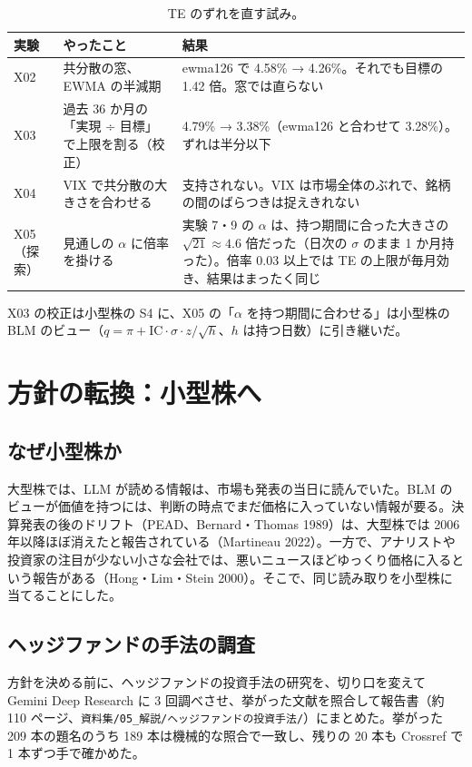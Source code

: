 \documentclass[xelatex,ja=standard,jafont=haranoaji,a4paper,10pt]{bxjsreport}
\newcommand{\code}[1]{\texttt{#1}}
\begin{document}
\begin{longtable}{p{2.0cm}p{5.4cm}p{6.4cm}}
\caption{TE のずれを直す試み。}\label{tab:te}\\
\toprule
\textbf{実験} & \textbf{やったこと} & \textbf{結果} \\
\midrule
\endfirsthead
\bottomrule
\endfoot
X02 & 共分散の窓、EWMA の半減期 & ewma126 で 4.58\% → 4.26\%。それでも目標の 1.42 倍。窓では直らない \\
X03 & 過去 36 か月の「実現 ÷ 目標」で上限を割る（校正） & 4.79\% → 3.38\%（ewma126 と合わせて 3.28\%）。ずれは半分以下 \\
X04 & VIX で共分散の大きさを合わせる & 支持されない。VIX は市場全体のぶれで、銘柄の間のばらつきは捉えきれない \\
X05（探索） & 見通しの $\alpha$ に倍率を掛ける & 実験 7・9 の $\alpha$ は、持つ期間に合った大きさの $\sqrt{21}\approx 4.6$ 倍だった（日次の $\sigma$ のまま 1 か月持った）。倍率 0.03 以上では TE の上限が毎月効き、結果はまったく同じ \\
\end{longtable}

X03 の校正は小型株の S4 に、X05 の「$\alpha$ を持つ期間に合わせる」は小型株の BLM のビュー（$q = \pi + \mathrm{IC}\cdot\sigma\cdot z/\sqrt{h}$、$h$ は持つ日数）に引き継いだ。

\chapter{方針の転換：小型株へ}\label{ch:pivot}

\section{なぜ小型株か}

大型株では、LLM が読める情報は、市場も発表の当日に読んでいた。BLM のビューが価値を持つには、判断の時点でまだ価格に入っていない情報が要る。決算発表の後のドリフト（PEAD、Bernard・Thomas 1989）は、大型株では 2006 年以降ほぼ消えたと報告されている（Martineau 2022）。一方で、アナリストや投資家の注目が少ない小さな会社では、悪いニュースほどゆっくり価格に入るという報告がある（Hong・Lim・Stein 2000）。そこで、同じ読み取りを小型株に当てることにした。

\section{ヘッジファンドの手法の調査}

方針を決める前に、ヘッジファンドの投資手法の研究を、切り口を変えて Gemini Deep Research に 3 回調べさせ、挙がった文献を照合して報告書（約 110 ページ、\code{資料集/05\_解説/ヘッジファンドの投資手法/}）にまとめた。挙がった 209 本の題名のうち 189 本は機械的な照合で一致し、残りの 20 本も Crossref で 1 本ずつ手で確かめた。
\end{document}
